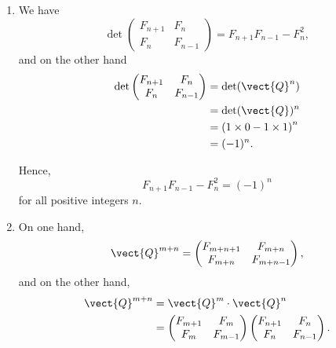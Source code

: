 \begin{enumerate}
    \item We have
          \[
              \det \begin{pmatrix}
                  F_{n + 1} & F_n \\ F_n & F_{n - 1}
              \end{pmatrix} = F_{n + 1} F_{n - 1} - F_n^2,
          \]
          and on the other hand
          \begin{align*}
              \det \begin{pmatrix}
                       F_{n + 1} & F_n \\ F_n & F_{n - 1}
                   \end{pmatrix} & = \det (\vect{Q}^n)                                      \\
                                                 & = \det(\vect{Q})^n                       \\
                                                 & = \left(1 \times 0 - 1 \times 1\right)^n \\
                                                 & = (-1)^n.
          \end{align*}

          Hence,
          \[
              F_{n + 1} F_{n - 1} - F_n^2 = (-1)^n
          \]
          for all positive integers \(n\).

    \item On one hand,
          \[
              \vect{Q}^{m + n} = \begin{pmatrix}
                  F_{m + n + 1} & F_{m + n} \\ F_{m + n} & F_{m + n - 1}
              \end{pmatrix},
          \]
          and on the other hand,
          \begin{align*}
              \vect{Q}^{m + n} & = \vect{Q}^m \cdot \vect{Q}^n                         \\
                               & = \begin{pmatrix}
                                       F_{m + 1} & F_{m} \\ F_{m} & F_{m - 1}
                                   \end{pmatrix} \begin{pmatrix}
                                                     F_{n + 1} & F_{n} \\ F_{n} & F_{n - 1}
                                                 \end{pmatrix}.
          \end{align*}


\end{enumerate}
